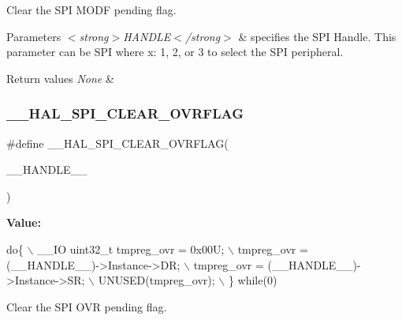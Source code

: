 Clear the S\+PI M\+O\+DF pending flag. 


\begin{DoxyParams}{Parameters}
{\em $<$strong$>$\+H\+A\+N\+D\+L\+E$<$/strong$>$} & specifies the S\+PI Handle. This parameter can be S\+PI where x\+: 1, 2, or 3 to select the S\+PI peripheral. \\
\hline
\end{DoxyParams}

\begin{DoxyRetVals}{Return values}
{\em None} & \\
\hline
\end{DoxyRetVals}
\mbox{\label{group___s_p_i___exported___macros_gaf6af33b1c5d334b9fe7bb778c5b6442e}} 
\subsubsection{\texorpdfstring{\+\_\+\+\_\+\+H\+A\+L\+\_\+\+S\+P\+I\+\_\+\+C\+L\+E\+A\+R\+\_\+\+O\+V\+R\+F\+L\+AG}{\_\_HAL\_SPI\_CLEAR\_OVRFLAG}}
{\footnotesize\ttfamily \#define \+\_\+\+\_\+\+H\+A\+L\+\_\+\+S\+P\+I\+\_\+\+C\+L\+E\+A\+R\+\_\+\+O\+V\+R\+F\+L\+AG(\begin{DoxyParamCaption}\item[{}]{\+\_\+\+\_\+\+H\+A\+N\+D\+L\+E\+\_\+\+\_\+ }\end{DoxyParamCaption})}

{\bfseries Value\+:}
\begin{DoxyCode}
\textcolor{keywordflow}{do}\{                                              \(\backslash\)
    \_\_IO uint32\_t tmpreg\_ovr = 0x00U;              \(\backslash\)
    tmpreg\_ovr = (\_\_HANDLE\_\_)->Instance->DR;       \(\backslash\)
    tmpreg\_ovr = (\_\_HANDLE\_\_)->Instance->SR;       \(\backslash\)
    UNUSED(tmpreg\_ovr);                            \(\backslash\)
  \} \textcolor{keywordflow}{while}(0)
\end{DoxyCode}


Clear the S\+PI O\+VR pending flag. 


